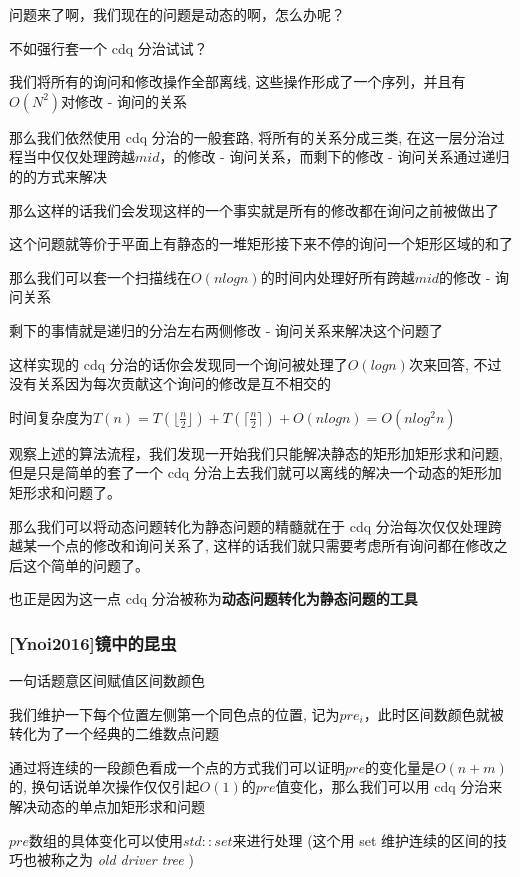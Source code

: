 问题来了啊，我们现在的问题是动态的啊，怎么办呢？

不如强行套一个 cdq 分治试试？

我们将所有的询问和修改操作全部离线, 这些操作形成了一个序列，并且有$O(N^2)$对修改 - 询问的关系

那么我们依然使用 cdq 分治的一般套路, 将所有的关系分成三类, 在这一层分治过程当中仅仅处理跨越$mid$，的修改 - 询问关系，而剩下的修改 - 询问关系通过递归的的方式来解决

那么这样的话我们会发现这样的一个事实就是所有的修改都在询问之前被做出了

这个问题就等价于平面上有静态的一堆矩形接下来不停的询问一个矩形区域的和了

那么我们可以套一个扫描线在$O(nlogn)$的时间内处理好所有跨越$mid$的修改 - 询问关系

剩下的事情就是递归的分治左右两侧修改 - 询问关系来解决这个问题了

这样实现的 cdq 分治的话你会发现同一个询问被处理了$O(logn)$次来回答, 不过没有关系因为每次贡献这个询问的修改是互不相交的

时间复杂度为$T(n)=T(\lfloor \frac{n}{2} \rfloor)+T(\lceil \frac{n}{2} \rceil)+ O(nlogn)=O(nlog^2n)$

观察上述的算法流程，我们发现一开始我们只能解决静态的矩形加矩形求和问题, 但是只是简单的套了一个 cdq 分治上去我们就可以离线的解决一个动态的矩形加矩形求和问题了。

那么我们可以将动态问题转化为静态问题的精髓就在于 cdq 分治每次仅仅处理跨越某一个点的修改和询问关系了, 这样的话我们就只需要考虑所有询问都在修改之后这个简单的问题了。

也正是因为这一点 cdq 分治被称为\textbf{动态问题转化为静态问题的工具}

\subsubsection{[Ynoi2016]镜中的昆虫}

一句话题意区间赋值区间数颜色

我们维护一下每个位置左侧第一个同色点的位置, 记为$pre_{i}$，此时区间数颜色就被转化为了一个经典的二维数点问题

通过将连续的一段颜色看成一个点的方式我们可以证明$pre$的变化量是$O(n+m)$的, 换句话说单次操作仅仅引起$O(1)$的$pre$值变化，那么我们可以用 cdq 分治来解决动态的单点加矩形求和问题

$pre$数组的具体变化可以使用$std::set$来进行处理 (这个用 set 维护连续的区间的技巧也被称之为 {\em old driver tree } )

